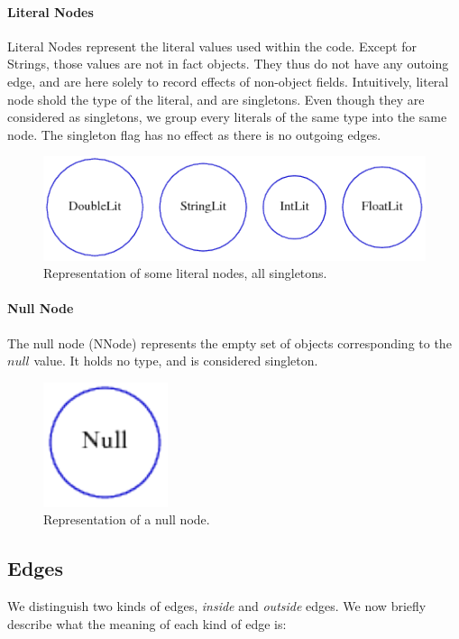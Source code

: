 \paragraph{Literal Nodes} Literal Nodes represent the literal values used
within the code. Except for Strings, those values are not in fact objects.
They thus do not have any outoing edge, and are here solely to record effects
of non-object fields. Intuitively, literal node shold the type of the literal,
and are singletons. Even though they are considered as singletons, we group
every literals of the same type into the same node. The singleton flag has no
effect as there is no outgoing edges.

\begin{figure}[h]
    \centering

    \includegraphics{images/pt_litnodes}

    \caption{Representation of some literal nodes, all singletons.}
    \label{fig:pt:litnodes}
\end{figure}


\paragraph{Null Node} The null node (NNode) represents the empty set of objects
corresponding to the $null$ value. It holds no type, and is considered singleton.

\begin{figure}[h]
    \centering

    \includegraphics{images/pt_nnodes}

    \caption{Representation of a null node.}
    \label{fig:pt:nnodes}
\end{figure}

\subsection{Edges}
We distinguish two kinds of edges, \emph{inside} and \emph{outside} edges. We now
briefly describe what the meaning of each kind of edge is:

